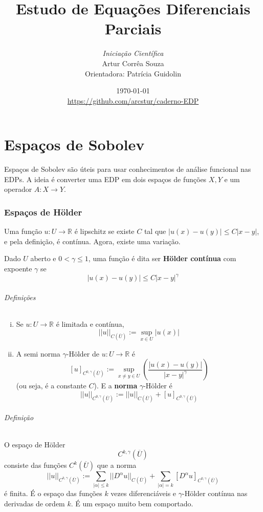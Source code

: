 \documentclass[a4paper, 11pt]{article}
\title{Estudo de Equações Diferenciais Parciais}
\author{\textit{Iniciação Científica}\\   Artur Corrêa Souza \\ Orientadora: Patrícia Guidolin}
\date{\today \\  \url{https://github.com/arcstur/caderno-EDP}}
\newcommand{\R}{\mathbb{R}}
\newcommand{\holder}[2][k,\gamma]{{C^{#1}(\overline{#2})}}
\begin{document}
\maketitle
\tableofcontents

% 

\setcounter{part}{1}
\part{Espaços de Sobolev}
Espaços de Sobolev são úteis para usar conhecimentos de análise funcional nas EDPs. A ideia é converter uma EDP em dois espaços de funções \( X,Y \) e um operador \( A:X \rightarrow Y \).

\newcommand{\sobolevdef}{W^{k,p}(U)}
\newcommand{\sobolevum}{W^{1,p}(U)}
\newcommand{\sobolevloc}{W^{k,p}_{loc}(U)}

\section{Espaços de Hölder}

Uma função \( u:U\rightarrow \R \) é lipschitz se existe \( C \) tal que \( |u(x)-u(y)| \leq C|x-y| \), e pela definição, é contínua. Agora, existe uma variação.

Dado \( U \) aberto e \( 0 < \gamma \leq 1 \), uma função é dita ser \textbf{Hölder contínua} com expoente \( \gamma \) se \[ |u(x)-u(y)| \leq C |x-y|^\gamma \]

\paragraph{Definições} \begin{enumerate}[(i)]
	\item Se \( u:U \rightarrow \R \) é limitada e contínua, \[ ||u||_{C(\overline{U})} := \sup_{x \in U} |u(x)| \]
	\item A semi norma \( \gamma \)-Hölder de \( u:U \rightarrow \R \) é \[ [u]_{C^{0,\gamma}(\overline{U})} := \sup_{x\neq y \in U} \left( \frac{|u(x) - u(y)|}{|x-y|^\gamma}\right) \] (ou seja, é a constante \( C \)). E a \textbf{norma} \( \gamma\)-Hölder é \[ ||u||_{C^{0,\gamma}(\overline{U})} := ||u||_{C(\overline{U})} + [u]_{C^{0,\gamma}(\overline{U})} \]
\end{enumerate}

\paragraph{Definição} O espaço de Hölder \[ \holder{U}  \] consiste das funções \( \holder[k]{U} \) que a norma \[ ||u||_{\holder{U}} := \sum_{|\alpha|\leq k} || D^\alpha u ||_{\holder[]{U}} + \sum_{|\alpha|=k} [ D^\alpha u ]_{\holder[0,\gamma]{U}} \] é finita. É o espaço das funções \( k\) vezes diferenciáveis e \( \gamma \)-Hölder contínua nas derivadas de ordem \( k \). É um espaço muito bem comportado.
\end{document}
